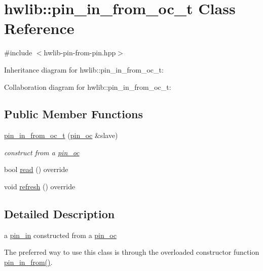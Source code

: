 \hypertarget{classhwlib_1_1pin__in__from__oc__t}{}\section{hwlib\+:\+:pin\+\_\+in\+\_\+from\+\_\+oc\+\_\+t Class Reference}
\label{classhwlib_1_1pin__in__from__oc__t}


{\ttfamily \#include $<$hwlib-\/pin-\/from-\/pin.\+hpp$>$}



Inheritance diagram for hwlib\+:\+:pin\+\_\+in\+\_\+from\+\_\+oc\+\_\+t\+:


Collaboration diagram for hwlib\+:\+:pin\+\_\+in\+\_\+from\+\_\+oc\+\_\+t\+:
\subsection*{Public Member Functions}
\begin{DoxyCompactItemize}
\item 
\mbox{\label{classhwlib_1_1pin__in__from__oc__t_abebbc3a5bf5351fa9c4d1c1e0c7768a2}} 
\hyperlink{classhwlib_1_1pin__in__from__oc__t_abebbc3a5bf5351fa9c4d1c1e0c7768a2}{pin\+\_\+in\+\_\+from\+\_\+oc\+\_\+t} (\hyperlink{classhwlib_1_1pin__oc}{pin\+\_\+oc} \&slave)
\begin{DoxyCompactList}\small\item\em construct from a \hyperlink{classhwlib_1_1pin__oc}{pin\+\_\+oc} \end{DoxyCompactList}\item 
bool \hyperlink{classhwlib_1_1pin__in__from__oc__t_a451b54793f3bfb713bd90edb115c9ef2}{read} () override
\item 
void \hyperlink{classhwlib_1_1pin__in__from__oc__t_a2c0103a43cb2c3d65d944a645a54a8c6}{refresh} () override
\end{DoxyCompactItemize}


\subsection{Detailed Description}
a \hyperlink{classhwlib_1_1pin__in}{pin\+\_\+in} constructed from a \hyperlink{classhwlib_1_1pin__oc}{pin\+\_\+oc}

The preferred way to use this class is through the overloaded constructor function \hyperlink{namespacehwlib_a2f8ff4c157c60783c37db6bb1e11e3a4}{pin\+\_\+in\+\_\+from()}. 

